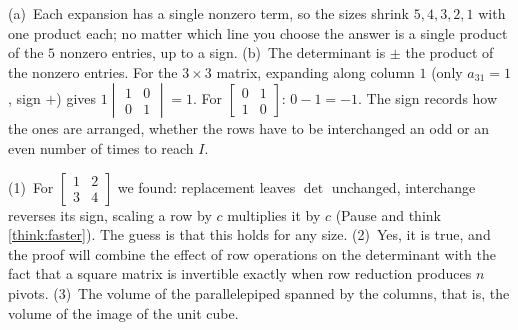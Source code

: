 \documentclass[11pt]{article}
\begin{document}
\begin{description}[leftmargin=0pt,itemsep=5pt]
  \item[Pause and think \ref{think:zerosplace}.] (a)~Each expansion has a single nonzero term, so the sizes shrink $5,4,3,2,1$ with one product each; no matter which line you choose the answer is a single product of the $5$ nonzero entries, up to a sign. (b)~The determinant is $\pm$ the product of the nonzero entries. For the $3\times3$ matrix, expanding along column $1$ (only $a_{31}=1$, sign $+$) gives $1\begin{vmatrix}1&0\\0&1\end{vmatrix}=1$. For $\begin{bmatrix}0&1\\1&0\end{bmatrix}$: $0-1=-1$. The sign records how the ones are arranged, whether the rows have to be interchanged an odd or an even number of times to reach $I$.
  \item[Before the next section.] (1)~For $\begin{bmatrix}1&2\\3&4\end{bmatrix}$ we found: replacement leaves $\det$ unchanged, interchange reverses its sign, scaling a row by $c$ multiplies it by $c$ (Pause and think \ref{think:faster}). The guess is that this holds for any size. (2)~Yes, it is true, and the proof will combine the effect of row operations on the determinant with the fact that a square matrix is invertible exactly when row reduction produces $n$ pivots. (3)~The volume of the parallelepiped spanned by the columns, that is, the volume of the image of the unit cube.
\end{description}
\end{document}
